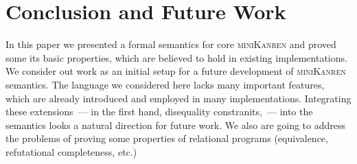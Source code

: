\section{Conclusion and Future Work}

In this paper we presented a formal semantics for core \textsc{miniKanren} and proved some its basic properties,
which are believed to hold in existing implementations. We consider out work as an initial setup for a future development
of \textsc{miniKanren} semantics. The language we considered here lacks many important features, which are already introduced
and employed in many implementations. Integrating these extensions~--- in the first hand, disequality constranits,~--- into
the semantics looks a natural direction for future work. We also are going to address the problems of proving some
properties of relational programs (equivalence, refutational completeness, etc.)


